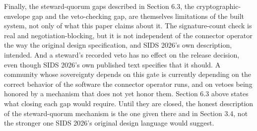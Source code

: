 Finally, the steward-quorum gaps described in Section 6.3, the cryptographic-envelope gap and the veto-checking gap, are themselves limitations of the built system, not only of what this paper claims about it. The signature-count check is real and negotiation-blocking, but it is not independent of the connector operator the way the original design specification, and SIDS 2026's own description, intended. And a steward's recorded veto has no effect on the release decision, even though SIDS 2026's own published text specifies that it should. A community whose sovereignty depends on this gate is currently depending on the correct behavior of the software the connector operator runs, and on vetoes being honored by a mechanism that does not yet honor them. Section 6.3 above states what closing each gap would require. Until they are closed, the honest description of the steward-quorum mechanism is the one given there and in Section 3.4, not the stronger one SIDS 2026's original design language would suggest.

